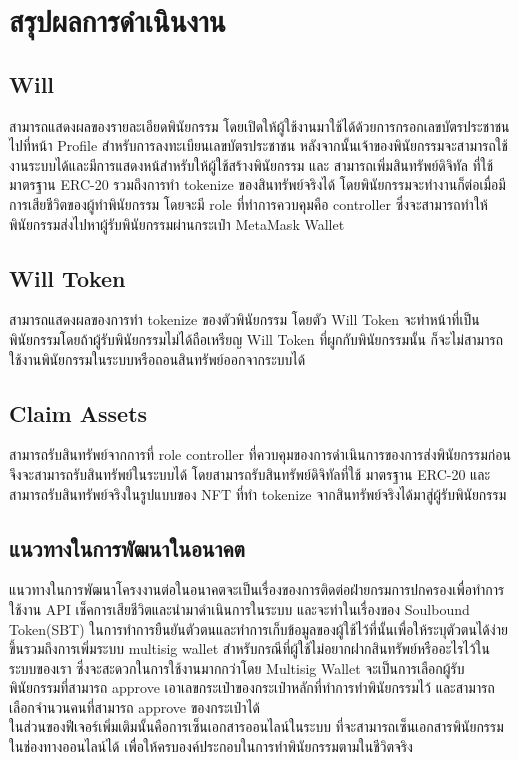 \documentclass[12pt,oneside,openright,a4paper]{cpe-thai-project}
\begin{document}
\section{สรุปผลการดำเนินงาน}
\subsection{Will}
\tab สามารถแสดงผลของรายละเอียดพินัยกรรม โดยเปิดให้ผู้ใช้งานมาใช้ได้ด้วยการกรอกเลขบัตรประชาชนไปที่หน้า Profile สำหรับการลงทะเบียนเลขบัตรประชาชน หลังจากนั้นเจ้าของพินัยกรรมจะสามารถใช้งานระบบได้และมีการแสดงหน้สำหรับให้ผู้ใช้สร้างพินัยกรรม และ สามารถเพิ่มสินทรัพย์ดิจิทัล ที่ใช้มาตรฐาน ERC-20 รวมถึงการทำ tokenize ของสินทรัพย์จริงได้ โดยพินัยกรรมจะทำงานก็ต่อเมื่อมีการเสียชีวิตของผู้ทำพินัยกรรม โดยจะมี role ที่ทำการควบคุมคือ controller ซึ่งจะสามารถทำให้พินัยกรรมส่งไปหาผู้รับพินัยกรรมผ่านกระเป๋า MetaMask Wallet\\
\subsection{Will Token}
\tab สามารถแสดงผลของการทำ tokenize ของตัวพินัยกรรม โดยตัว Will Token จะทำหน้าที่เป็นพินัยกรรมโดยถ้าผู้รับพินัยกรรมไม่ได้ถือเหรียญ Will Token ที่ผูกกับพินัยกรรมนั้น ก็จะไม่สามารถใช้งานพินัยกรรมในระบบหรือถอนสินทรัพย์ออกจากระบบได้\\
\subsection{Claim Assets}
\tab สามารถรับสินทรัพย์จากการที่ role controller ที่ควบคุมของการดำเนินการของการส่งพินัยกรรมก่อนจึงจะสามารถรับสินทรัพย์ในระบบได้ โดยสามารถรับสินทรัพย์ดิจิทัลที่ใช้ มาตรฐาน ERC-20 และ สามารถรับสินทรัพย์จริงในรูปแบบของ NFT ที่ทำ tokenize จากสินทรัพย์จริงได้มาสู่ผู้รับพินัยกรรม\\

\subsection{แนวทางในการพัฒนาในอนาคต}
\tab แนวทางในการพัฒนาโครงงานต่อในอนาคตจะเป็นเรื่องของการติดต่อฝ่ายกรมการปกครองเพื่อทำการใช้งาน API เช็คการเสียชีวิตและนำมาดำเนินการในระบบ และจะทำในเรื่องของ Soulbound Token(SBT) ในการทำการยืนยันตัวตนและทำการเก็บข้อมูลของผู้ใช้ไว้ที่นั้นเพื่อให้ระบุตัวตนได้ง่ายขึ้นรวมถึงการเพิ่มระบบ multisig wallet สำหรับกรณีที่ผู้ใช้ไม่อยากฝากสินทรัพย์หรืออะไรไว้ในระบบของเรา ซึ่งจะสะดวกในการใช้งานมากกว่าโดย Multisig Wallet จะเป็นการเลือกผู้รับพินัยกรรมที่สามารถ approve เอาเลขกระเป๋าของกระเป๋าหลักที่ทำการทำพินัยกรรมไว้ และสามารถเลือกจำนวนคนที่สามารถ approve ของกระเป๋าได้\\
\tab ในส่วนของฟีเจอร์เพิ่มเติมนั้นคือการเซ็นเอกสารออนไลน์ในระบบ ที่จะสามารถเซ็นเอกสารพินัยกรรมในช่องทางออนไลน์ได้ เพื่อให้ครบองค์ประกอบในการทำพินัยกรรมตามในชีวิตจริง\\
\end{document}
